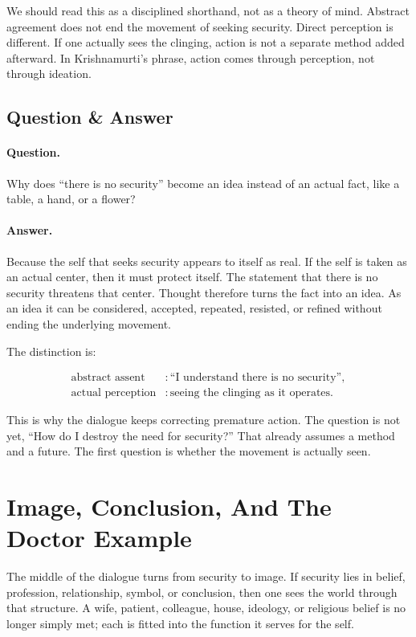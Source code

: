 We should read this as a disciplined shorthand, not as a theory of mind. Abstract agreement does not end the movement of seeking security. Direct perception is different. If one actually sees the clinging, action is not a separate method added afterward. In Krishnamurti's phrase, action comes through perception, not through ideation.

\subsection{Question \& Answer}

\paragraph{Question.}
Why does ``there is no security'' become an idea instead of an actual fact, like a table, a hand, or a flower?

\paragraph{Answer.}
Because the self that seeks security appears to itself as real. If the self is taken as an actual center, then it must protect itself. The statement that there is no security threatens that center. Thought therefore turns the fact into an idea. As an idea it can be considered, accepted, repeated, resisted, or refined without ending the underlying movement.

The distinction is:

\begin{align}
\text{abstract assent} &: \text{``I understand there is no security''}, \\
\text{actual perception} &: \text{seeing the clinging as it operates}.
\end{align}

This is why the dialogue keeps correcting premature action. The question is not yet, ``How do I destroy the need for security?'' That already assumes a method and a future. The first question is whether the movement is actually seen.

\section{Image, Conclusion, And The Doctor Example}

The middle of the dialogue turns from security to image. If security lies in belief, profession, relationship, symbol, or conclusion, then one sees the world through that structure. A wife, patient, colleague, house, ideology, or religious belief is no longer simply met; each is fitted into the function it serves for the self.

